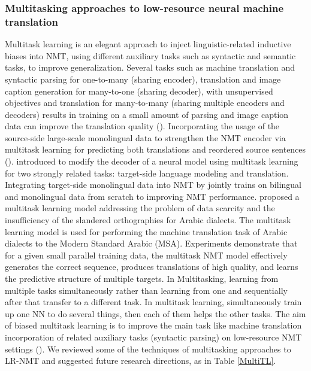 \documentclass[manuscript,screen]{acmart}
\begin{document}
\subsubsection{\textbf{Multitasking approaches to low-resource neural machine translation}}
Multitask learning is an elegant approach to inject linguistic-related inductive biases into NMT, using different auxiliary tasks such as syntactic and semantic tasks, to improve generalization. 
 Several tasks such as machine translation and syntactic parsing for one-to-many (sharing encoder), translation and image caption generation for many-to-one (sharing decoder), with unsupervised objectives and translation for many-to-many (sharing multiple encoders and decoders) results in training on a small amount of parsing and image caption
data can improve the translation quality (\citet{luong2015multi}). 
Incorporating the usage of the source-side large-scale monolingual data to strengthen the NMT encoder via multitask learning for predicting both translations and reordered source sentences (\citet{zhang2016exploiting}). \citet{domhan2017using} introduced to modify the decoder of a neural model using multitask learning for two strongly related tasks: target-side language modeling and translation. Integrating target-side monolingual data into NMT by jointly trains on bilingual and monolingual data from scratch to improving NMT performance. \citet{baniata2018neural} proposed a multitask learning model addressing the problem of data scarcity and the insufficiency of the slandered orthographies for Arabic dialects. The multitask learning model is used for performing the machine translation task of Arabic dialects to the Modern Standard Arabic (MSA). Experiments demonstrate that for a given small parallel training data, the multitask NMT model effectively generates the correct sequence, produces translations of high quality, and learns the predictive structure of multiple targets.
In Multitasking, learning from multiple tasks simultaneously rather than learning from one and sequentially after that transfer to a different task. In multitask learning, simultaneously train up one NN to do several things, then each of them helps the other tasks. The aim of biased multitask learning is to improve the main task like machine translation incorporation of related auxiliary tasks (syntactic parsing) on low-resource NMT settings (\citet{zaremoodi2019adaptively}). We reviewed some of the techniques of multitasking approaches to LR-NMT and suggested future research directions, as in Table \ref{MultiTL}.
\end{document}
